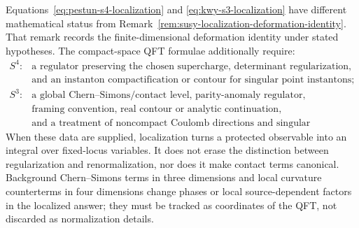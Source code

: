 Equations~\eqref{eq:pestun-s4-localization} and
\eqref{eq:kwy-s3-localization} have different mathematical status from
Remark~\ref{rem:susy-localization-deformation-identity}.  That
remark records the finite-dimensional deformation identity under stated
hypotheses.  The compact-space QFT formulae additionally require:
\[
\begin{array}{ll}
S^4:&
\text{a regulator preserving the chosen supercharge, determinant
regularization,}\\
&\text{and an instanton compactification or contour for singular point
instantons;}\\[3pt]
S^3:&
\text{a global Chern--Simons/contact level, parity-anomaly regulator,}\\
&\text{framing convention, real contour or analytic continuation,}\\
&\text{and a treatment of noncompact Coulomb directions and singular
hyperplanes.}
\end{array}
\]
When these data are supplied, localization turns a protected observable into
an integral over fixed-locus variables.  It does not erase the distinction
between regularization and renormalization, nor does it make contact terms
canonical.  Background Chern--Simons terms in three dimensions and local
curvature counterterms in four dimensions change phases or local
source-dependent factors in the localized answer; they must be tracked as
coordinates of the QFT, not discarded as normalization details.
